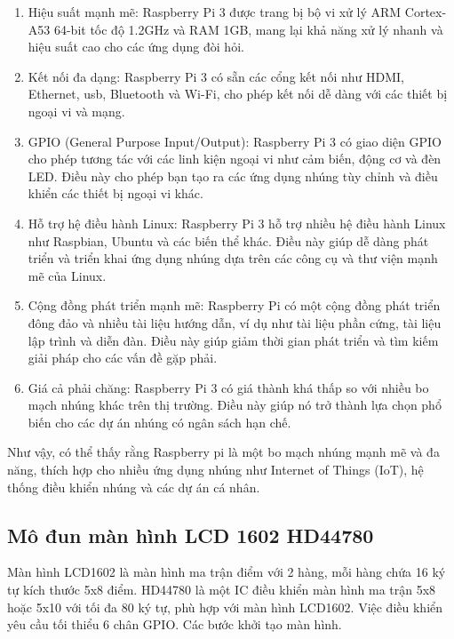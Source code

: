 \documentclass{report}
\begin{document}
\begin{enumerate}
	\item Hiệu suất mạnh mẽ: Raspberry Pi 3 được trang bị bộ vi xử lý ARM Cortex-A53 64-bit tốc độ 1.2GHz và RAM 1GB, mang lại khả năng xử lý nhanh và hiệu suất cao cho các ứng dụng đòi hỏi.
	
	\item Kết nối đa dạng: Raspberry Pi 3 có sẵn các cổng kết nối như HDMI, Ethernet, \acrshort{usb}, Bluetooth và Wi-Fi, cho phép kết nối dễ dàng với các thiết bị ngoại vi và mạng.
	
	\item GPIO (General Purpose Input/Output): Raspberry Pi 3 có giao diện GPIO cho phép tương tác với các linh kiện ngoại vi như cảm biến, động cơ và đèn LED. Điều này cho phép bạn tạo ra các ứng dụng nhúng tùy chỉnh và điều khiển các thiết bị ngoại vi khác.
	
	\item Hỗ trợ hệ điều hành Linux: Raspberry Pi 3 hỗ trợ nhiều hệ điều hành Linux như Raspbian, Ubuntu và các biến thể khác. Điều này giúp dễ dàng phát triển và triển khai ứng dụng nhúng dựa trên các công cụ và thư viện mạnh mẽ của Linux.
	
	\item Cộng đồng phát triển mạnh mẽ: Raspberry Pi có một cộng đồng phát triển đông đảo và nhiều tài liệu hướng dẫn, ví dụ như tài liệu phần cứng, tài liệu lập trình và diễn đàn. Điều này giúp giảm thời gian phát triển và tìm kiếm giải pháp cho các vấn đề gặp phải.
	
	\item Giá cả phải chăng: Raspberry Pi 3 có giá thành khá thấp so với nhiều bo mạch nhúng khác trên thị trường. Điều này giúp nó trở thành lựa chọn phổ biến cho các dự án nhúng có ngân sách hạn chế.
\end{enumerate}

Như vậy, có thể thấy rằng Raspberry pi là một bo mạch nhúng mạnh mẽ và đa năng, thích hợp cho nhiều ứng dụng nhúng như Internet of Things (IoT), hệ thống điều khiển nhúng và các dự án cá nhân. 
\subsection{Mô đun màn hình LCD 1602 HD44780}

Màn hình LCD1602 là màn hình ma trận điểm với 2 hàng, mỗi hàng chứa 16 ký tự kích thước 5x8 điểm. HD44780 là một IC điều khiển màn hình ma trận 5x8 hoặc 5x10 với tối đa 80 ký tự, phù hợp với màn hình LCD1602. Việc điều khiển yêu cầu tối thiểu 6 chân GPIO. Các bước khởi tạo màn hình.
\end{document}
